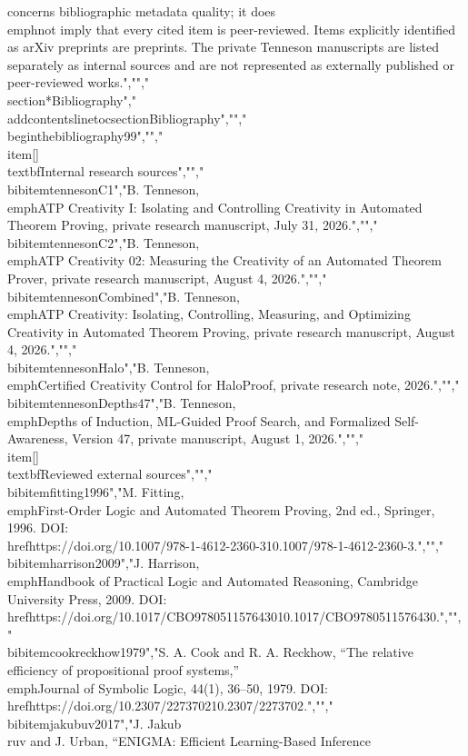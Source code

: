 {{{concerns bibliographic metadata quality; it does \\emph{not} imply that every cited item is peer-reviewed. Items explicitly identified as arXiv preprints are preprints. The private Tenneson manuscripts are listed separately as internal sources and are not represented as externally published or peer-reviewed works.","","\\section*{Bibliography}","\\addcontentsline{toc}{section}{Bibliography}","","\\begin{thebibliography}{99}","","\\item[]\\textbf{Internal research sources}","","\\bibitem{tennesonC1}","B. Tenneson, \\emph{ATP Creativity I: Isolating and Controlling Creativity in Automated Theorem Proving}, private research manuscript, July 31, 2026.","","\\bibitem{tennesonC2}","B. Tenneson, \\emph{ATP Creativity 02: Measuring the Creativity of an Automated Theorem Prover}, private research manuscript, August 4, 2026.","","\\bibitem{tennesonCombined}","B. Tenneson, \\emph{ATP Creativity: Isolating, Controlling, Measuring, and Optimizing Creativity in Automated Theorem Proving}, private research manuscript, August 4, 2026.","","\\bibitem{tennesonHalo}","B. Tenneson, \\emph{Certified Creativity Control for HaloProof}, private research note, 2026.","","\\bibitem{tennesonDepths47}","B. Tenneson, \\emph{Depths of Induction, ML-Guided Proof Search, and Formalized Self-Awareness}, Version 47, private manuscript, August 1, 2026.","","\\item[]\\textbf{Reviewed external sources}","","\\bibitem{fitting1996}","M. Fitting, \\emph{First-Order Logic and Automated Theorem Proving}, 2nd ed., Springer, 1996. DOI: \\href{https://doi.org/10.1007/978-1-4612-2360-3}{10.1007/978-1-4612-2360-3}.","","\\bibitem{harrison2009}","J. Harrison, \\emph{Handbook of Practical Logic and Automated Reasoning}, Cambridge University Press, 2009. DOI: \\href{https://doi.org/10.1017/CBO9780511576430}{10.1017/CBO9780511576430}.","","\\bibitem{cookreckhow1979}","S. A. Cook and R. A. Reckhow, ``The relative efficiency of propositional proof systems,'' \\emph{Journal of Symbolic Logic}, 44(1), 36--50, 1979. DOI: \\href{https://doi.org/10.2307/2273702}{10.2307/2273702}.","","\\bibitem{jakubuv2017}","J. Jakub\\r{u}v and J. Urban, ``ENIGMA: Efficient Learning-Based Inference }}}
